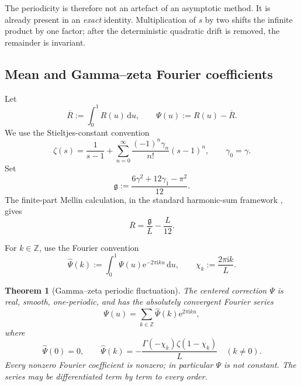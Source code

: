 \documentclass[11pt]{article}
\numberwithin{equation}{section}
\newtheorem{theorem}{Theorem}[section]
\theoremstyle{definition}
\theoremstyle{remark}
\newcommand{\Z}{\mathbb Z}
\newcommand{\dd}{\,\mathrm d}
\newcommand{\e}{\mathrm e}
\newcommand{\ii}{\mathrm i}
\begin{document}
The periodicity is therefore not an artefact of an asymptotic method.  It is
already present in an \emph{exact} identity.  Multiplication of $s$ by two
shifts the infinite product by one factor; after the deterministic quadratic
drift is removed, the remainder is invariant.

\subsection{Mean and Gamma--zeta Fourier coefficients}

Let
\begin{equation}\label{p3:eq:R-mean-Psi}
 \overline R:=\int_0^1R(u)\dd u,
 \qquad \Psi(u):=R(u)-\overline R.
\end{equation}
We use the Stieltjes-constant convention
\begin{equation}\label{p3:eq:Stieltjes-convention}
 \zeta(s)=\frac1{s-1}
 +\sum_{n=0}^{\infty}\frac{(-1)^n\gamma_n}{n!}(s-1)^n,
 \qquad \gamma_0=\gamma.
\end{equation}
Set
\begin{equation}\label{p3:eq:gmathfrak}
 \mathfrak g:=\frac{6\gamma^2+12\gamma_1-\pi^2}{12}.
\end{equation}
The finite-part Mellin calculation, in the standard harmonic-sum framework \cite{p3:FlajoletMellin}, gives
\begin{equation}\label{p3:eq:R-mean}
 \overline R=\frac{\mathfrak g}{L}-\frac L{12}.
\end{equation}

For $k\in\Z$, use the Fourier convention
\begin{equation}\label{p3:eq:Psi-Fourier-convention}
 \widehat\Psi(k):=\int_0^1\Psi(u)\e^{-2\pi\ii ku}\dd u,
 \qquad
 \chi_k:=\frac{2\pi\ii k}{L}.
\end{equation}

\begin{theorem}[Gamma--zeta periodic fluctuation]\label{p3:thm:Psi-Fourier}
The centered correction $\Psi$ is real, smooth, one-periodic, and has the
absolutely convergent Fourier series
\begin{equation}\label{p3:eq:Psi-Fourier-series}
 \Psi(u)=\sum_{k\in\Z}\widehat\Psi(k)\e^{2\pi\ii ku},
\end{equation}
where
\begin{equation}\label{p3:eq:Psi-Fourier-coeff}
 \widehat\Psi(0)=0,
 \qquad
 \boxed{
 \widehat\Psi(k)=-\frac{\Gamma(-\chi_k)\zeta(1-\chi_k)}{L}}
 \quad(k\ne0).
\end{equation}
Every nonzero Fourier coefficient is nonzero; in particular $\Psi$ is not
constant.  The series may be differentiated term by term to every order.
\end{theorem}
\end{document}
